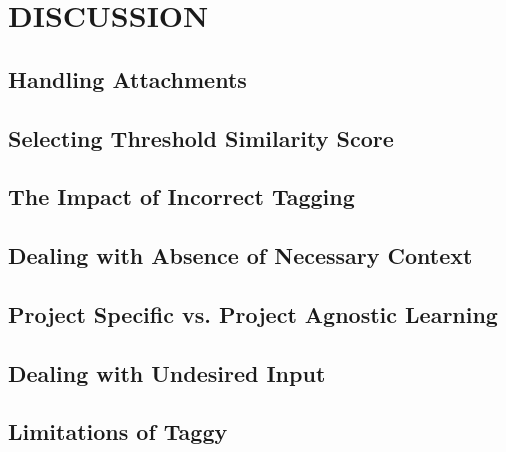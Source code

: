 \fancyhead[RO,LE]{\thepage}
\fancyfoot{} 
\chapter{DISCUSSION}
\section{Handling Attachments}
\section{Selecting Threshold Similarity Score}
\section{The Impact of Incorrect Tagging}
\section{Dealing with Absence of Necessary Context}
\section{Project Specific vs. Project Agnostic Learning}
\section{Dealing with Undesired Input}
\section{Limitations of Taggy}



